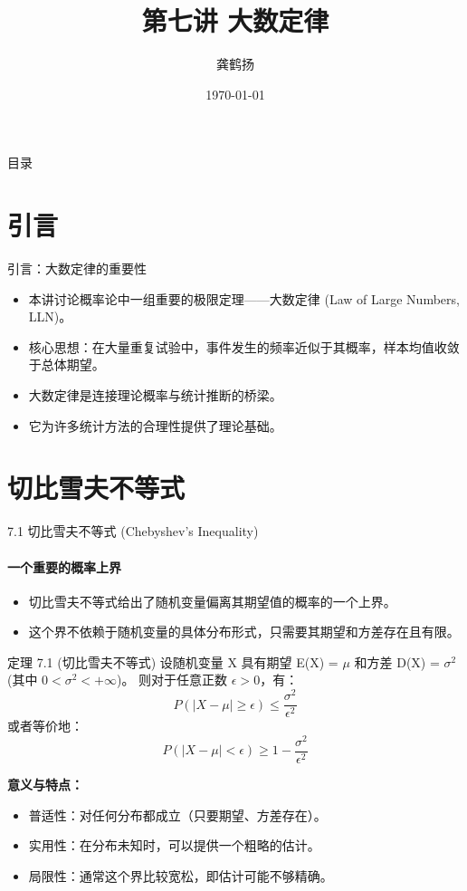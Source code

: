 \documentclass[UTF8]{beamer} %
\title{第七讲 大数定律}
\author{龚鹤扬}
\institute{中国科学技术大学统计学博士(上海芯梯科技有限公司)} %
\date{\today}
\begin{document}
\begin{frame}
    \titlepage
\end{frame}

\begin{frame}{目录}
    \tableofcontents
\end{frame}

\section{引言}
\begin{frame}{引言：大数定律的重要性}
    \begin{itemize}
        \item 本讲讨论概率论中一组重要的极限定理——\alert{大数定律 (Law of Large Numbers, LLN)}。
        \item 核心思想：在大量重复试验中，事件发生的\alert{频率}近似于其\alert{概率}，样本均值收敛于总体\alert{期望}。
        \item 大数定律是连接\alert{理论概率}与\alert{统计推断}的桥梁。
        \item 它为许多统计方法的合理性提供了理论基础。
    \end{itemize}
\end{frame}

\section{切比雪夫不等式}
\begin{frame}[shrink=5]{7.1 切比雪夫不等式 (Chebyshev's Inequality)}
    \framesubtitle{一个重要的概率上界}
    \begin{itemize}
        \item 切比雪夫不等式给出了随机变量偏离其期望值的概率的一个\alert{上界}。
        \item 这个界不依赖于随机变量的具体分布形式，只需要其\alert{期望}和\alert{方差}存在且有限。
    \end{itemize}
    \pause
    \begin{block}{定理 7.1 (切比雪夫不等式)}
        设随机变量 X 具有期望 E(X) = $\mu$ 和方差 D(X) = $\sigma^2$ (其中 $0 < \sigma^2 < +\infty$)。
        则对于任意正数 $\epsilon > 0$，有：
        \[ P(|X - \mu| \geq \epsilon) \leq \frac{\sigma^2}{\epsilon^2} \]
        或者等价地：
        \[ P(|X - \mu| < \epsilon) \geq 1 - \frac{\sigma^2}{\epsilon^2} \]
    \end{block}
    \pause
    \textbf{意义与特点：}
    \begin{itemize}
        \item \alert{普适性}：对任何分布都成立（只要期望、方差存在）。
        \item \alert{实用性}：在分布未知时，可以提供一个粗略的估计。
        \item \alert{局限性}：通常这个界比较宽松，即估计可能不够精确。
    \end{itemize}
\end{frame}
\end{document}

